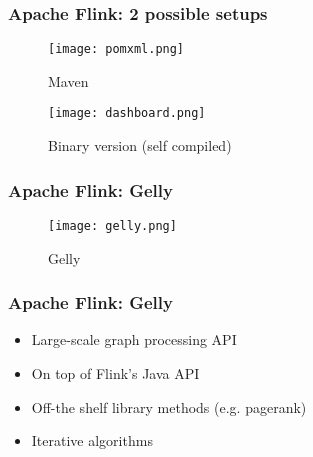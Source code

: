 \begin{frame}
\frametitle{Apache Flink: 2 possible setups}

\begin{minipage}[l]{0.5\textwidth}
\begin{figure}
	\centering
	\texttt{[image: pomxml.png]}
	\caption{Maven}
\end{figure}
\end{minipage}
\begin{minipage}[l]{0.49\textwidth}
\begin{figure}
	\centering
	\texttt{[image: dashboard.png]}
	\caption{Binary version (self compiled)}
\end{figure}
\end{minipage}
\end{frame}

\begin{frame}
\frametitle{Apache Flink: Gelly}

\begin{figure}
	\centering
	\texttt{[image: gelly.png]}
	\caption{Gelly}
\end{figure}

\end{frame}

\begin{frame}
\frametitle{Apache Flink: Gelly}
\begin{itemize}
\item Large-scale graph processing API
\item On top of Flink's Java API
\item Off-the shelf library methods (e.g. pagerank)
\item Iterative algorithms
\end{itemize}


\end{frame}
